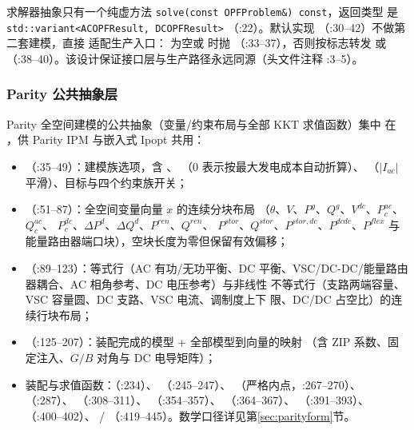 
求解器抽象只有一个纯虚方法
\texttt{solve(const OPFProblem\&) const}，返回类型
 是 \texttt{std::variant<ACOPFResult, DCOPFResult>}
（:22）。默认实现 （:30--42）不做第二套建模，直接
适配生产入口： 为空或  时抛
（:33--37），否则按标志转发
 或 
（:38--40）。该设计保证接口层与生产路径永远同源（头文件注释 :3--5）。

\subsubsection*{Parity 公共抽象层}

Parity 全空间建模的公共抽象（变量/约束布局与全部 KKT 求值函数）集中
在 ，供
Parity IPM 与嵌入式 Ipopt 共用：

\begin{itemize}
  \item {}（:35--49）：建模族选项，含 、
        （0 表示按最大发电成本自动折算）、
        （$|I_{ac}|$ 平滑）、目标与四个约束族开关；
  \item {}（:51--87）：全空间变量向量 $x$ 的连续分块布局
        （$\theta$、$V$、$P^g$、$Q^g$、$V^{dc}$、$P^{ac}_c$、$Q^{ac}_c$、
        $P^{dc}_c$、$\Delta P^d$、$\Delta Q^d$、$P^{ren}$、$Q^{ren}$、
        $P^{stor}$、$Q^{stor}$、$P^{stor,dc}$、$P^{dcdc}$、$P^{flex}$
        与能量路由器端口块），空块长度为零但保留有效偏移；
  \item {}（:89--123）：等式行（AC 有功/无功平衡、DC
        平衡、VSC/DC-DC/能量路由器耦合、AC 相角参考、DC 电压参考）与非线性
        不等式行（支路两端容量、VSC 容量圆、DC 支路、VSC 电流、调制度上下
        限、DC/DC 占空比）的连续行块布局；
  \item {}（:125--207）：装配完成的模型 + 全部模型到向量的映射
        （含 ZIP 系数、固定注入、$G/B$ 对角与 DC 电导矩阵）；
  \item 装配与求值函数：（:234）、
        （:245--247）、
        （严格内点，:267--270）、
        （:287）、
        （:308--311）、
        （:354--357）、
        （:364--367）、
        （:391--393）、
        （:400--402）、
        /
        （:419--445）。数学口径详见第\ref{sec:parityform}节。
\end{itemize}

